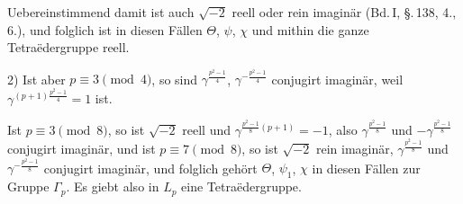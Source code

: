 Uebereinstimmend damit ist auch $\sqrt{-2}$ reell oder rein imaginär
(Bd.\,I, \S.\,138, 4., 6.), und folglich ist in diesen Fällen $\Theta$,
$\psi$, $\chi$ und mithin die ganze Tetraëdergruppe reell.

2) Ist aber $p \equiv 3 \pmod 4$, so sind $\gamma^{\frac{p^2-1}{4}}$,
$\gamma^{-\frac{p^2-1}{4}}$ conjugirt imaginär, weil
$\gamma^{(p+1)\frac{p^2-1}{4}} = 1$ ist.

Ist $p \equiv 3 \pmod 8$, so ist $\sqrt{-2}$ reell und
$\gamma^{\frac{p^2-1}{8}(p+1)} = -1$, also $\gamma^{\frac{p^2-1}{8}}$
und $-\gamma^{\frac{p^2-1}{8}}$ conjugirt imaginär, und ist $p \equiv 7
\pmod 8$, so ist $\sqrt{-2}$ rein imaginär, $\gamma^{\frac{p^2-1}{8}}$
und $\gamma^{-\frac{p^2-1}{8}}$ conjugirt imaginär, und folglich gehört
$\Theta$, $\psi_1$, $\chi$ in diesen Fällen zur Gruppe $\Gamma_p$. Es
giebt also in  $L_p$ eine Tetraëdergruppe.

